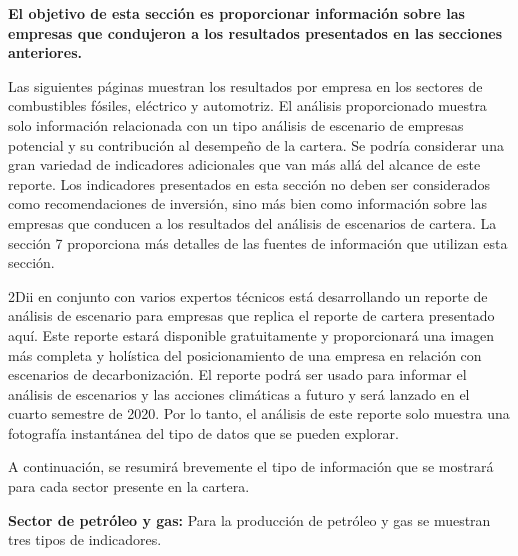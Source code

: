 \documentclass[10pt,table]{article}\usepackage[]{graphicx}\usepackage[]{color}
\begin{document}
	\begin{multicols}{2}
		
		\textbf{El objetivo de esta sección es proporcionar información sobre las empresas que condujeron a los resultados presentados en las secciones anteriores.}
		
	Las siguientes páginas muestran los resultados por empresa en los sectores de combustibles fósiles, eléctrico y automotriz. El análisis proporcionado muestra solo información relacionada con un tipo análisis de escenario de empresas potencial y su contribución al desempeño de la cartera. Se podría considerar una gran variedad de indicadores adicionales que van más allá del alcance de este reporte. Los indicadores presentados en esta sección no deben ser considerados como recomendaciones de inversión, sino más bien como información sobre las empresas que conducen a los resultados del análisis de escenarios de cartera. La sección 7 proporciona más detalles de las fuentes de información que utilizan esta sección.
		
		2Dii en conjunto con varios expertos técnicos está desarrollando un reporte de análisis de escenario para empresas que replica el reporte de cartera presentado aquí. Este reporte estará disponible gratuitamente y proporcionará una imagen más completa y holística del posicionamiento de una empresa en relación con escenarios de decarbonización. El reporte podrá ser usado para informar el análisis de escenarios y las acciones climáticas a futuro y será lanzado en el cuarto semestre de 2020. Por lo tanto, el análisis de este reporte solo muestra una fotografía instantánea del tipo de datos que se pueden explorar.
		
	A continuación, se resumirá brevemente el tipo de información que se mostrará para cada sector presente en la cartera. 
		
		\textbf{Sector de petróleo y gas: }Para la producción de petróleo y gas se muestran tres tipos de indicadores.
		

\end{multicols}
\end{document}
